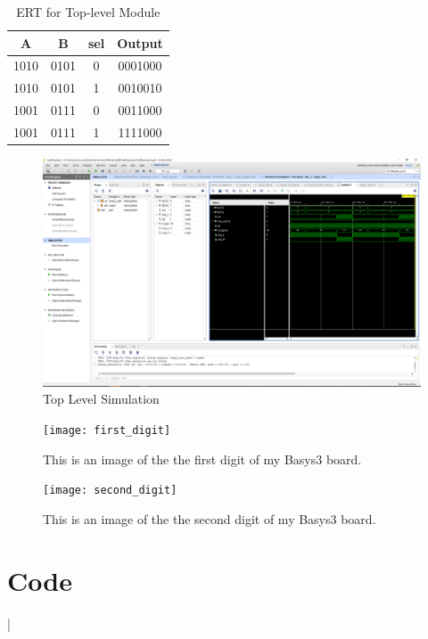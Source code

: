 \documentclass[11pt]{article}
\newcommand{\Verilog}[2][]{%
	
}
\begin{document}
\begin{table}[ht]\centering
	\caption{ERT for Top-level Module}
	\label{tbl:example_table}
	\begin{tabular}{ccc|c}
		\toprule
		 A & B & sel & Output \\
		\midrule
		1010 & 0101 & 0 & 0001000 \\
		1010 & 0101 & 1 & 0010010 \\
		1001 & 0111 & 0 & 0011000 \\
		1001 & 0111 & 1 & 1111000 \\
		\bottomrule
	\end{tabular} 
\end{table}

\begin{figure}[ht]\centering
	\includegraphics[width=1\textwidth,trim=21cm 18cm 0.5cm 4.7cm,clip]{sseg_screenshot}
	\caption{Top Level Simulation}
	\label{fig:sim_with_table}
\end{figure}

\begin{figure}[ht]\centering
\texttt{[image: first\_digit]}
\caption{This is an image of the the first digit of my Basys3 board.}
\label{fig:original_logo}
\end{figure}
\begin{figure}[ht]\centering
\texttt{[image: second\_digit]}
\caption{This is an image of the the second digit of my Basys3 board.}
\label{fig:original_logo}
\end{figure}
 \FloatBarrier
\section*{Code}

\Verilog[firstline=22, lastline=31, caption=MUX Verilog code]{Lab06_project/codedirectory/mux2_4b.sv}|
\end{document}
